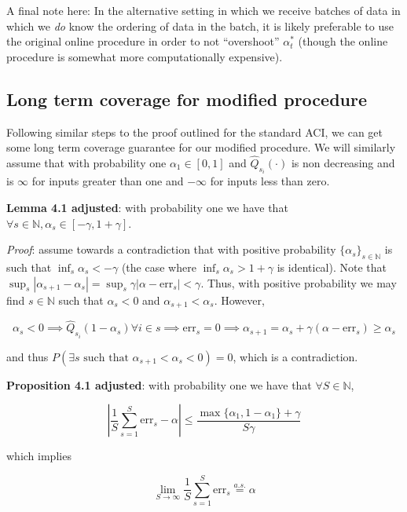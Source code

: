 \documentclass[
]{article}
\begin{document}
A final note here: In the alternative setting in which we receive
batches of data in which we \emph{do} know the ordering of data in the
batch, it is likely preferable to use the original online procedure in
order to not ``overshoot'' \(\alpha_t^*\) (though the online procedure
is somewhat more computationally expensive).

\hypertarget{long-term-coverage-for-modified-procedure}{%
\subsection{Long term coverage for modified
procedure}\label{long-term-coverage-for-modified-procedure}}

Following similar steps to the proof outlined for the standard ACI, we
can get some long term coverage guarantee for our modified procedure. We
will similarly assume that with probability one \(\alpha_1 \in [0, 1]\)
and \(\hat{Q}_{s_i}(\cdot)\) is non decreasing and is \(\infty\) for
inputs greater than one and \(-\infty\) for inputs less than zero.

\textbf{Lemma 4.1 adjusted}: with probability one we have that
\(\forall s \in \mathbb{N}, \alpha_s \in [-\gamma, 1+\gamma]\).

\emph{Proof}: assume towards a contradiction that with positive
probability \(\{\alpha_s\}_{s \in \mathbb{N}}\) is such that
\(\inf_s \alpha_s < -\gamma\) (the case where
\(\inf_s \alpha_s > 1 + \gamma\) is identical). Note that
\(\sup_s |\alpha_{s+1} − \alpha_s| = \sup_s \gamma | \alpha − \textrm{err}_s| < \gamma\).
Thus, with positive probability we may find \(s \in \mathbb{N}\) such
that \(\alpha_s < 0\) and \(\alpha_{s + 1} < \alpha_s\). However,

\[ \alpha_s < 0 \implies \hat{Q}_{s_i} (1 - \alpha_s) \forall i \in s \implies \textrm{err}_s = 0 \implies \alpha_{s+1} = \alpha_s + \gamma(\alpha - \textrm{err}_s) \ge \alpha_s \]

and thus
\(P(\exists s \textrm{ such that } \alpha_{s+1} < \alpha_s < 0) = 0\),
which is a contradiction.

\textbf{Proposition 4.1 adjusted}: with probability one we have that
\(\forall S \in \mathbb{N}\),

\[ | \frac{1}{S} \sum_{s=1}^S \textrm{err}_s - \alpha | \le \frac{\max \{ \alpha_1, 1- \alpha_1 \} + \gamma}{S \gamma} \]

which implies

\[ \lim_{S \to \infty} \frac{1}{S} \sum_{s=1}^S \textrm{err}_s \stackrel{a.s.}{=} \alpha \]
\end{document}
